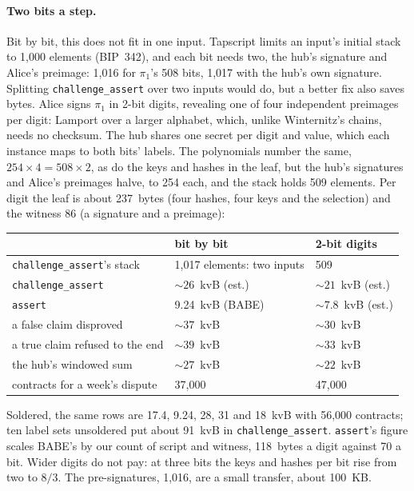 \documentclass[11pt]{article}
\newcommand{\tx}[1]{\texttt{#1}}
\begin{document}
\paragraph{Two bits a step.} Bit by bit, this does not fit in one
input. Tapscript limits an input's initial stack to 1,000 elements
(BIP~342), and each bit needs two, the hub's signature and Alice's
preimage: 1,016 for $\pi_1$'s 508 bits, 1,017 with the hub's own
signature. Splitting \tx{challenge\_assert} over two inputs would do,
but a better fix also saves bytes. Alice signs $\pi_1$ in 2-bit digits,
revealing one of four independent preimages per digit: Lamport over a
larger alphabet, which, unlike Winternitz's chains, needs no checksum.
The hub shares one secret per digit and value, which each instance maps
to both bits' labels. The polynomials number the same, $254 \times 4 =
508 \times 2$, as do the keys and hashes in the leaf, but the hub's
signatures and Alice's preimages halve, to 254 each, and the stack
holds 509 elements. Per digit the leaf is about 237~bytes (four hashes,
four keys and the selection) and the witness 86 (a signature and a
preimage):
\begin{center}
\small
\begin{tabularx}{\linewidth}{>{\raggedright\arraybackslash}p{50mm}LL}
\toprule
& bit by bit & 2-bit digits \\
\midrule
\tx{challenge\_assert}'s stack & 1,017 elements: two inputs & 509 \\
\tx{challenge\_assert} & ${\sim}26$~kvB (est.) & ${\sim}21$~kvB (est.) \\
\tx{assert} & 9.24~kvB (BABE) & ${\sim}7.8$~kvB (est.) \\
a false claim disproved & ${\sim}37$~kvB & ${\sim}30$~kvB \\
a true claim refused to the end & ${\sim}39$~kvB & ${\sim}33$~kvB \\
the hub's windowed sum & ${\sim}27$~kvB & ${\sim}22$~kvB \\
contracts for a week's dispute & 37,000 & 47,000 \\
\bottomrule
\end{tabularx}
\end{center}
Soldered, the same rows are 17.4, 9.24, 28, 31 and 18~kvB with 56,000
contracts; ten label sets unsoldered put about 91~kvB in
\tx{challenge\_assert}. \tx{assert}'s figure scales BABE's by our
count of script and witness, 118~bytes a digit against 70 a bit. Wider
digits do not pay: at three bits the keys
and hashes per bit rise from two to $8/3$. The pre-signatures, 1,016,
are a small transfer, about 100~KB.
\end{document}

